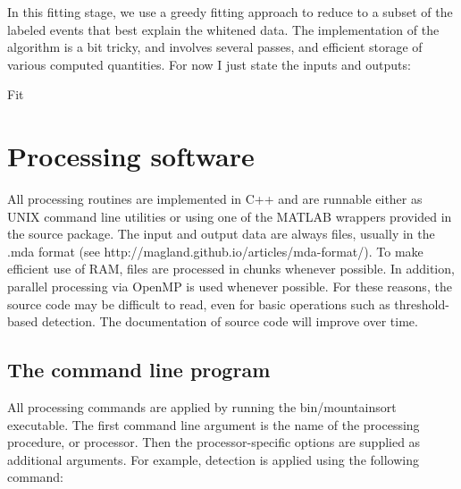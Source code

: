 \documentclass[hidelinks,10pt]{article}
\begin{document}
In this fitting stage, we use a greedy fitting approach to reduce to a subset of the labeled events that best explain the whitened data. The implementation of the algorithm is a bit tricky, and involves several passes, and efficient storage of various computed quantities. For now I just state the inputs and outputs:

\begin{algorithm}
\DontPrintSemicolon %

\caption{{\sc Fit}}
\label{algo:fit}
\end{algorithm}


\section {Processing software}

All processing routines are implemented in C++ and are runnable either as UNIX command line utilities or using one of the MATLAB wrappers provided in the source package. The input and output data are always files, usually in the .mda format (see http://magland.github.io/articles/mda-format/). To make efficient use of RAM, files are processed in chunks whenever possible. In addition, parallel processing via OpenMP is used whenever possible. For these reasons, the source code may be difficult to read, even for basic operations such as threshold-based detection. The documentation of source code will improve over time.

\subsection {The command line program}

All processing commands are applied by running the bin/mountainsort executable. The first command line argument is the name of the processing procedure, or processor. Then the processor-specific options are supplied as additional arguments. For example, detection is applied using the following command:
\end{document}
